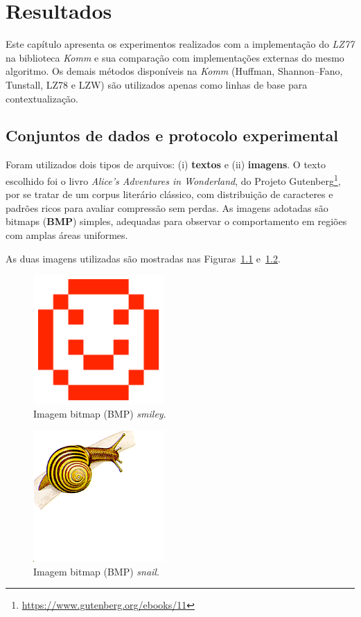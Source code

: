 \chapter{Resultados}\label{cap:Resultados}

Este capítulo apresenta os experimentos realizados com a implementação do \textit{LZ77} na biblioteca \textit{Komm} e sua comparação com implementações externas do mesmo algoritmo. Os demais métodos disponíveis na \textit{Komm} (Huffman, Shannon--Fano, Tunstall, LZ78 e LZW) são utilizados apenas como linhas de base para contextualização.

\section{Conjuntos de dados e protocolo experimental}

Foram utilizados dois tipos de arquivos: (i) \textbf{textos} e (ii) \textbf{imagens}. O texto escolhido foi o livro \textit{Alice’s Adventures in Wonderland}, do Projeto Gutenberg\footnote{\url{https://www.gutenberg.org/ebooks/11}}, por se tratar de um corpus literário clássico, com distribuição de caracteres e padrões ricos para avaliar compressão sem perdas. As imagens adotadas são bitmaps (\textbf{BMP}) simples, adequadas para observar o comportamento em regiões com amplas áreas uniformes.

As duas imagens utilizadas são mostradas nas Figuras~\ref{fig:smiley} e~\ref{fig:snail}.

\begin{figure}[h]
  \centering
  \caption{Imagem bitmap (BMP) \textit{smiley}.}
  \label{fig:smiley}
  \includegraphics[width=5cm]{figuras/smiley-large.png}
\end{figure}

\begin{figure}[h]
  \centering
  \caption{Imagem bitmap (BMP) \textit{snail}.}
  \label{fig:snail}
  \includegraphics[width=5cm]{figuras/snail.png}
\end{figure}

